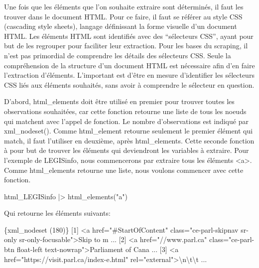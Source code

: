 \documentclass[
  letterpaper,
  DIV=11,
  numbers=noendperiod]{scrreprt}
\newenvironment{Shaded}{\begin{snugshade}}{\end{snugshade}}
\newcommand{\DataTypeTok}[1]{\textcolor[rgb]{0.68,0.00,0.00}{#1}}
\newcommand{\ErrorTok}[1]{\textcolor[rgb]{0.68,0.00,0.00}{#1}}
\newcommand{\ExtensionTok}[1]{\textcolor[rgb]{0.00,0.23,0.31}{#1}}
\newcommand{\KeywordTok}[1]{\textcolor[rgb]{0.00,0.23,0.31}{#1}}
\newcommand{\NormalTok}[1]{\textcolor[rgb]{0.00,0.23,0.31}{#1}}
\newcommand{\OperatorTok}[1]{\textcolor[rgb]{0.37,0.37,0.37}{#1}}
\newcommand{\StringTok}[1]{\textcolor[rgb]{0.13,0.47,0.30}{#1}}
\begin{document}
Une fois que les éléments que l'on souhaite extraire sont déterminés, il
faut les trouver dans le document HTML. Pour ce faire, il faut se
référer au style CSS (cascading style sheets), langage définissant la
forme visuelle d'un document HTML. Les éléments HTML sont identifiés
avec des ``sélecteurs CSS'', ayant pour but de les regrouper pour
faciliter leur extraction. Pour les bases du scraping, il n'est pas
primordial de comprendre les détails des sélecteurs CSS. Seule la
compréhension de la structure d'un document HTML est nécessaire afin
d'en faire l'extraction d'éléments. L'important est d'être en mesure
d'identifier les sélecteurs CSS liés aux éléments souhaités, sans avoir
à comprendre le sélecteur en question.

D'abord, html\_elements doit être utilisé en premier pour trouver toutes
les observations souhaitées, car cette fonction retourne une liste de
tous les noeuds qui matchent avec l'appel de fonction. Le nombre
d'observations est indiqué par xml\_nodeset(). Comme html\_element
retourne seulement le premier élément qui match, il faut l'utiliser en
deuxième, après html\_elements. Cette seconde fonction à pour but de
trouver les éléments qui deviendront les variables à extraire. Pour
l'exemple de LEGISinfo, nous commencerons par extraire tous les éléments
\textless a\textgreater. Comme html\_elements retourne une liste, nous
voulons commencer avec cette fonction.

\begin{Shaded}
\begin{Highlighting}[]
\ExtensionTok{html\_LEGISinfo} \KeywordTok{|}\OperatorTok{\textgreater{}}\NormalTok{ html\_elements}\KeywordTok{(}\StringTok{"a"}\KeywordTok{)}
\end{Highlighting}
\end{Shaded}

Qui retourne les éléments suivants:

\begin{Shaded}
\begin{Highlighting}[]
\ExtensionTok{\{xml\_nodeset} \ErrorTok{(}\ExtensionTok{180}\KeywordTok{)}\ErrorTok{\}}
 \ExtensionTok{[1]} \OperatorTok{\textless{}}\NormalTok{a href=}\StringTok{"\#StartOfContent"}\NormalTok{ class=}\StringTok{"ce{-}parl{-}skipnav sr{-}only sr{-}only{-}focusable"}\OperatorTok{\textgreater{}}\NormalTok{Skip to m ...}
 \ExtensionTok{[2]} \OperatorTok{\textless{}}\NormalTok{a href=}\StringTok{"//www.parl.ca"}\NormalTok{ class=}\StringTok{"ce{-}parl{-}btn float{-}left text{-}nowrap"}\OperatorTok{\textgreater{}}\NormalTok{Parliament of Cana ...}
 \ExtensionTok{[3]} \OperatorTok{\textless{}}\NormalTok{a href=}\StringTok{"https://visit.parl.ca/index{-}e.html"}\NormalTok{ rel=}\StringTok{"external"}\OperatorTok{\textgreater{}}\DataTypeTok{\textbackslash{}n\textbackslash{}t\textbackslash{}t}\NormalTok{                    ...}
\end{Highlighting}
\end{Shaded}
\end{document}
